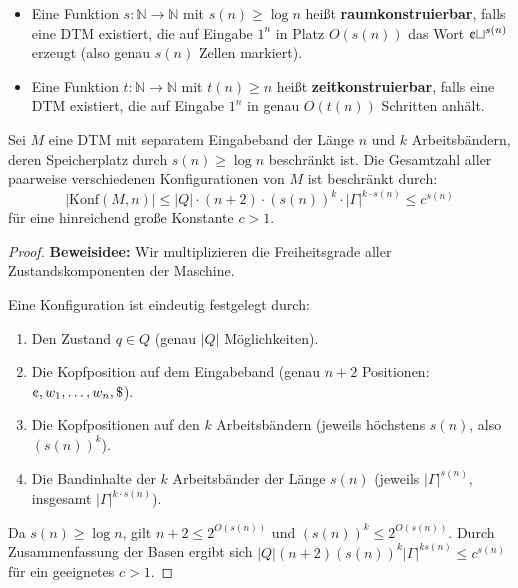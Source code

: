 \begin{definition}
    \begin{itemize}
        \item Eine Funktion $s : \mathbb{N} \to \mathbb{N}$ mit $s(n) \ge \log n$ heißt \textbf{raumkonstruierbar}, falls eine DTM existiert, die auf Eingabe $1^n$ in Platz $O(s(n))$ das Wort $\text{\textcent} \sqcup^{s(n)}$ erzeugt (also genau $s(n)$ Zellen markiert).
        \item Eine Funktion $t : \mathbb{N} \to \mathbb{N}$ mit $t(n) \ge n$ heißt \textbf{zeitkonstruierbar}, falls eine DTM existiert, die auf Eingabe $1^n$ in genau $O(t(n))$ Schritten anhält.
    \end{itemize}
\end{definition}

\begin{theorem}
    Sei $M$ eine DTM mit separatem Eingabeband der Länge $n$ und $k$ Arbeitsbändern, deren Speicherplatz durch $s(n) \ge \log n$ beschränkt ist. Die Gesamtzahl aller paarweise verschiedenen Konfigurationen von $M$ ist beschränkt durch:
    \[
        |\mathrm{Konf}(M, n)| \le |Q| \cdot (n + 2) \cdot (s(n))^k \cdot |\Gamma|^{k \cdot s(n)} \le c^{s(n)}
    \]
    für eine hinreichend große Konstante $c > 1$.
\end{theorem}

\begin{proof}
    \textbf{Beweisidee:} Wir multiplizieren die Freiheitsgrade aller Zustandskomponenten der Maschine.
    
    Eine Konfiguration ist eindeutig festgelegt durch:
    \begin{enumerate}
        \item Den Zustand $q \in Q$ (genau $|Q|$ Möglichkeiten).
        \item Die Kopfposition auf dem Eingabeband (genau $n+2$ Positionen: $\text{\textcent}, w_1, \dots, w_n, \$$).
        \item Die Kopfpositionen auf den $k$ Arbeitsbändern (jeweils höchstens $s(n)$, also $(s(n))^k$).
        \item Die Bandinhalte der $k$ Arbeitsbänder der Länge $s(n)$ (jeweils $|\Gamma|^{s(n)}$, insgesamt $|\Gamma|^{k \cdot s(n)}$).
    \end{enumerate}
    Da $s(n) \ge \log n$, gilt $n+2 \le 2^{O(s(n))}$ und $(s(n))^k \le 2^{O(s(n))}$. Durch Zusammenfassung der Basen ergibt sich $|Q| (n+2) (s(n))^k |\Gamma|^{k s(n)} \le c^{s(n)}$ für ein geeignetes $c > 1$.
\end{proof}

